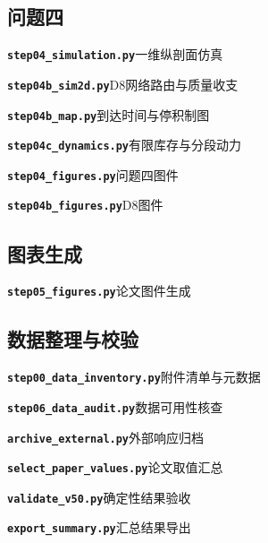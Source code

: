 \subsection*{问题四}
\noindent\textbf{\texttt{step04\_simulation.py}}\quad 一维纵剖面仿真\par\nopagebreak

\noindent\textbf{\texttt{step04b\_sim2d.py}}\quad D8网络路由与质量收支\par\nopagebreak

\noindent\textbf{\texttt{step04b\_map.py}}\quad 到达时间与停积制图\par\nopagebreak

\noindent\textbf{\texttt{step04c\_dynamics.py}}\quad 有限库存与分段动力\par\nopagebreak

\noindent\textbf{\texttt{step04\_figures.py}}\quad 问题四图件\par\nopagebreak

\noindent\textbf{\texttt{step04b\_figures.py}}\quad D8图件\par\nopagebreak


\subsection*{图表生成}
\noindent\textbf{\texttt{step05\_figures.py}}\quad 论文图件生成\par\nopagebreak


\subsection*{数据整理与校验}
\noindent\textbf{\texttt{step00\_data\_inventory.py}}\quad 附件清单与元数据\par\nopagebreak

\noindent\textbf{\texttt{step06\_data\_audit.py}}\quad 数据可用性核查\par\nopagebreak

\noindent\textbf{\texttt{archive\_external.py}}\quad 外部响应归档\par\nopagebreak

\noindent\textbf{\texttt{select\_paper\_values.py}}\quad 论文取值汇总\par\nopagebreak

\noindent\textbf{\texttt{validate\_v50.py}}\quad 确定性结果验收\par\nopagebreak

\noindent\textbf{\texttt{export\_summary.py}}\quad 汇总结果导出\par\nopagebreak


